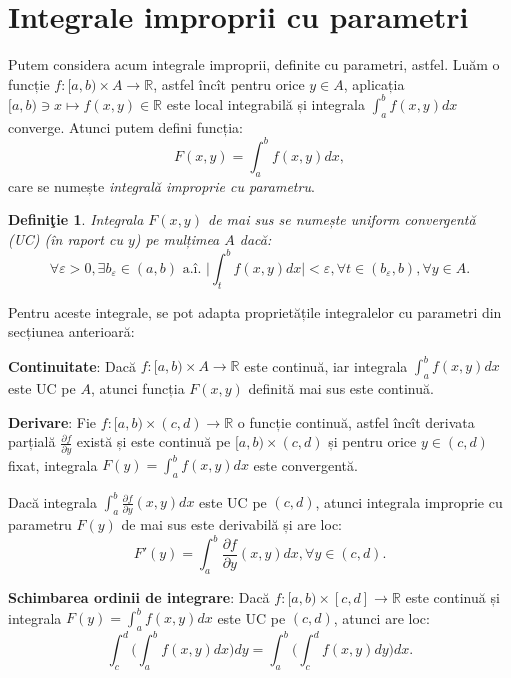 \documentclass[11pt,a4paper]{article}
\newcommand\ds{\displaystyle}
\newcommand\ai{\text{ a.\^{i}. }}
\newcommand\RR{\mathbb{R}}
\theoremstyle{dotless}
\theoremstyle{dotlessdr}
\newtheorem{definition}{Defini\c{t}ie}[section]
\begin{document}

\section{Integrale improprii cu parametri}
\label{sec:int-imp-par}

Putem considera acum integrale improprii, definite cu parametri, astfel.
Luăm o funcție $f : [a, b) \times A \to \RR$, astfel încît pentru orice $y \in A$,
aplicația $[a, b) \ni x \mapsto f(x, y) \in \RR$ este local integrabilă și integrala
$\ds\int_a^b f(x, y) dx$ converge. Atunci putem defini funcția:
\[
  F(x,y) = \int_a^b f(x, y) dx,
\]
care se numește \emph{integrală improprie cu parametru}.

\begin{definition}\label{def:uc}
  Integrala $F(x, y)$ de mai sus se numește \emph{uniform convergentă} (UC) (în raport cu $y$)
  pe mulțimea $A$ dacă:
  \[
    \forall \varepsilon > 0, \exists b_\varepsilon \in (a, b) \ai %
    \Big| \int_t^b f(x, y) dx \Big| < \varepsilon, \forall t \in (b_\varepsilon, b), %
    \forall y \in A.
  \]
\end{definition}

Pentru aceste integrale, se pot adapta proprietățile integralelor cu parametri
din secțiunea anterioară:

\textbf{Continuitate}: Dacă $f : [a, b) \times A \to \RR$ este continuă, iar
integrala $\ds\int_a^b f(x, y) dx$ este UC pe $A$, atunci funcția $F(x,y)$
definită mai sus este continuă.

\vspace{1cm}

\textbf{Derivare}: Fie $f: [a, b) \times (c, d) \to \RR$ o funcție continuă, astfel
încît derivata parțială $\frac{\partial f}{\partial y}$ există și este continuă pe
$[a, b) \times (c, d)$ și pentru orice $y \in (c, d)$ fixat, integrala
$F(y) = \ds\int_a^b f(x,y) dx$ este convergentă.

Dacă integrala $\ds\int_a^b \frac{\partial f}{\partial y}(x, y) dx$ este UC
pe $(c, d)$, atunci integrala improprie cu parametru $F(y)$ de mai sus este
derivabilă și are loc:
\[
  F'(y) = \int_a^b \frac{\partial f}{\partial y}(x, y) dx, \forall y \in (c, d).
\]

\vspace{1cm}

\textbf{Schimbarea ordinii de integrare}: Dacă $f : [a, b) \times [c, d] \to \RR$
este continuă și integrala $F(y) = \ds\int_a^b f(x, y) dx$ este UC pe $(c, d)$,
atunci are loc:
\[
  \int_c^d \Big( \int_a^b f(x, y) dx \Big) dy = %
  \int_a^b \Big( \int_c^d f(x, y) dy \Big) dx.
\]
\end{document}
